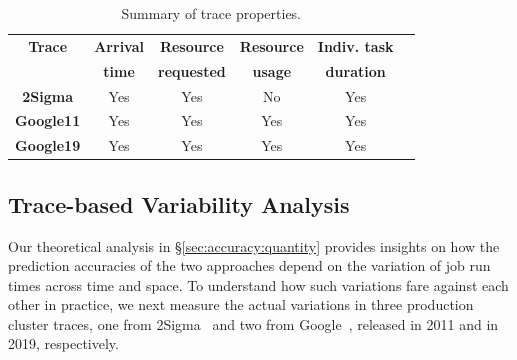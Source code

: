 \begin{table}[tp]
\caption{Summary of trace properties.}
\label{table:traceSummary}
\centering
{\small
\vspace{-0.1in}
\begin{tabular}{|c|c|c|c|c|c|}
\hline
		\textbf{ Trace} & \textbf{Arrival} & \textbf{Resource} & \textbf{Resource}  & \textbf{Indiv. task} \\
			& \textbf{time} & \textbf{requested} & \textbf{usage} & \textbf{duration}\\
 
\hline
	  \textbf{2Sigma} & Yes & Yes & No & Yes\\
\hline
	  \textbf{Google11} & Yes & Yes & Yes & Yes\\
\hline
	  \textbf{Google19} & Yes & Yes & Yes & Yes\\
\hline
%	 
\end{tabular}
\vspace{-0.1in}
}
\end{table}


\subsection{Trace-based Variability Analysis}
\label{sec:accuracy:trace}


Our theoretical analysis in \S\ref{sec:accuracy:quantity} provides 
insights on how the prediction accuracies of the two approaches depend
on the variation of job run times across time and space.
To understand how such variations fare against each other in practice,
we next measure the actual variations
in three production cluster traces, one from 2Sigma~\cite{2Sigma:website} and
two from Google~\cite{googleTraceGithub, googleClusterData2019},
released in 2011 and in 2019, respectively.

